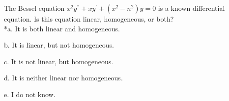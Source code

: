 
The Bessel equation \( x^{2}y^{''} + xy^{'} + ( x^{2} - n^{2} ) y = 0 \) is a known differential equation. Is this equation linear, homogeneous, or both? \\


*a. It is both linear and homogeneous.

b. It is linear, but not homogeneous.

c. It is not linear, but homogeneous.

d. It is neither linear nor homogeneous.

e. I do not know. \\
